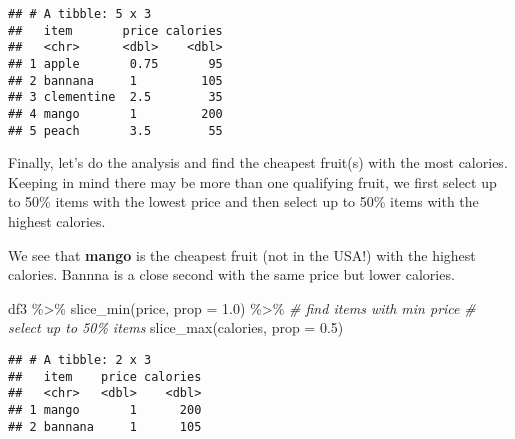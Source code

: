\documentclass[
]{article}
\newenvironment{Shaded}{\begin{snugshade}}{\end{snugshade}}
\newcommand{\AttributeTok}[1]{\textcolor[rgb]{0.77,0.63,0.00}{#1}}
\newcommand{\CommentTok}[1]{\textcolor[rgb]{0.56,0.35,0.01}{\textit{#1}}}
\newcommand{\FloatTok}[1]{\textcolor[rgb]{0.00,0.00,0.81}{#1}}
\newcommand{\FunctionTok}[1]{\textcolor[rgb]{0.00,0.00,0.00}{#1}}
\newcommand{\NormalTok}[1]{#1}
\newcommand{\SpecialCharTok}[1]{\textcolor[rgb]{0.00,0.00,0.00}{#1}}
\begin{document}
\begin{verbatim}
## # A tibble: 5 x 3
##   item       price calories
##   <chr>      <dbl>    <dbl>
## 1 apple       0.75       95
## 2 bannana     1         105
## 3 clementine  2.5        35
## 4 mango       1         200
## 5 peach       3.5        55
\end{verbatim}

Finally, let's do the analysis and find the cheapest fruit(s) with the
most calories. Keeping in mind there may be more than one qualifying
fruit, we first select up to 50\% items with the lowest price and then
select up to 50\% items with the highest calories.

We see that \textbf{mango} is the cheapest fruit (not in the USA!) with
the highest calories. Bannna is a close second with the same price but
lower calories.

\begin{Shaded}
\begin{Highlighting}[]
\NormalTok{df3 }\SpecialCharTok{\%\textgreater{}\%}
    \FunctionTok{slice\_min}\NormalTok{(price, }\AttributeTok{prop =} \FloatTok{1.0}\NormalTok{) }\SpecialCharTok{\%\textgreater{}\%}   \CommentTok{\# find items with min price}
                                       \CommentTok{\# select up to 50\% items}
    \FunctionTok{slice\_max}\NormalTok{(calories, }\AttributeTok{prop =} \FloatTok{0.5}\NormalTok{)}
\end{Highlighting}
\end{Shaded}

\begin{verbatim}
## # A tibble: 2 x 3
##   item    price calories
##   <chr>   <dbl>    <dbl>
## 1 mango       1      200
## 2 bannana     1      105
\end{verbatim}
\end{document}
